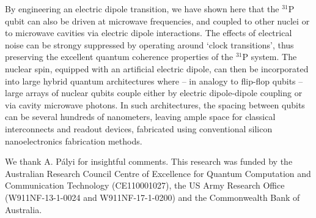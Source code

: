 \documentclass[
 aps,prb,twocolumn,
 amsmath,amssymb,superscriptaddress,
] {revtex4-1}
\begin{document}
By engineering an electric dipole transition, we have shown here that the $^{31}$P qubit can also be driven at microwave frequencies, and coupled to other nuclei or to microwave cavities via electric dipole interactions. The effects of electrical noise can be strongy suppressed by operating around `clock transitions', thus preserving the excellent quantum coherence properties of the $^{31}$P system. The nuclear spin, equipped with an artificial electric dipole, can then be incorporated into large hybrid quantum architectures \cite{Xiang2013} where -- in analogy to flip-flop qubits \cite{Tosi2017} -- large arrays of nuclear qubits couple either by electric dipole-dipole coupling or via cavity microwave photons. In such architectures, the spacing between qubits can be several hundreds of nanometers, leaving ample space for classical interconnects \cite{Fischer2015,Franke2018} and readout devices, fabricated using conventional silicon nanoelectronics fabrication methods.


\begin{acknowledgements}
We thank A. P{\'a}lyi for insightful comments. This research was funded by the Australian Research Council Centre of Excellence for Quantum Computation and Communication Technology (CE110001027), the US Army Research Office (W911NF-13-1-0024 and W911NF-17-1-0200) and the Commonwealth Bank of Australia.
\end{acknowledgements}




\end{document}
